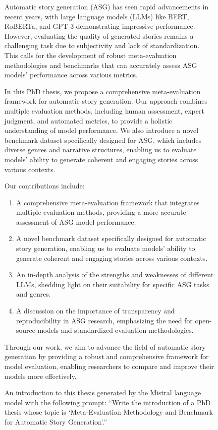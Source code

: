 \begin{figure}[h!]
    \small
    \begin{framed}
    Automatic story generation (ASG) has seen rapid advancements in recent years, with large language models (LLMs) like BERT, RoBERTa, and GPT-3 demonstrating impressive performance. However, evaluating the quality of generated stories remains a challenging task due to subjectivity and lack of standardization. This calls for the development of robust meta-evaluation methodologies and benchmarks that can accurately assess ASG models' performance across various metrics.
    
    In this PhD thesis, we propose a comprehensive meta-evaluation framework for automatic story generation. Our approach combines multiple evaluation methods, including human assessment, expert judgment, and automated metrics, to provide a holistic understanding of model performance. We also introduce a novel benchmark dataset specifically designed for ASG, which includes diverse genres and narrative structures, enabling us to evaluate models' ability to generate coherent and engaging stories across various contexts.
    
    Our contributions include:

    \begin{enumerate}[nolistsep]
        \item  A comprehensive meta-evaluation framework that integrates multiple evaluation methods, providing a more accurate assessment of ASG model performance.
        \item A novel benchmark dataset specifically designed for automatic story generation, enabling us to evaluate models' ability to generate coherent and engaging stories across various contexts.
        \item An in-depth analysis of the strengths and weaknesses of different LLMs, shedding light on their suitability for specific ASG tasks and genres.
        \item A discussion on the importance of transparency and reproducibility in ASG research, emphasizing the need for open-source models and standardized evaluation methodologies.
    \end{enumerate}
    
    Through our work, we aim to advance the field of automatic story generation by providing a robust and comprehensive framework for model evaluation, enabling researchers to compare and improve their models more effectively.
    \end{framed}
    \caption{An introduction to this thesis generated by the Mistral language model with the following prompt: ``Write the introduction of a PhD thesis whose topic is `Meta-Evaluation Methodology and Benchmark for Automatic Story Generation'.''}
    \label{fig:fake_introduction}
\end{figure}

